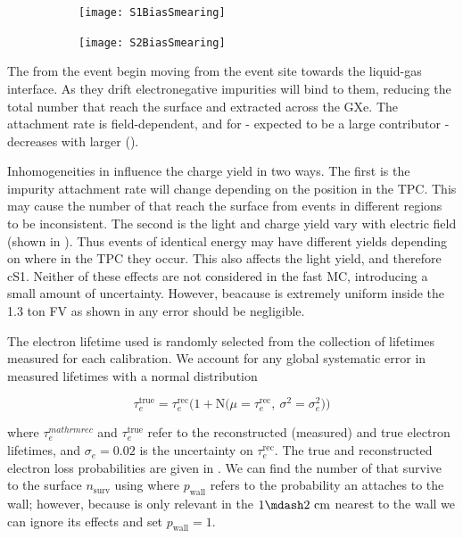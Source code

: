 \begin{figure}
    \centering
    \begin{subfigure}[t]{0.45\textwidth}
        \centering
        \texttt{[image: S1BiasSmearing]}
    \end{subfigure}%
    \begin{subfigure}[t]{0.45\textwidth}
        \centering
        \texttt{[image: S2BiasSmearing]}
    \end{subfigure}
    \caption{}
	\label{fig:er_nr_calibrations_parameter_determ_det_phys_bias_smear}
\end{figure}

The \electron from the event begin moving from the event site towards the liquid-gas interface.  As they drift electronegative
impurities will bind to them, reducing the total number that reach the surface and extracted across the GXe.  The attachment rate
is field-dependent, and for  - expected to be a large contributor - decreases with larger \ed
().

Inhomogeneities in \ed influence the charge yield in two ways.  The first is the impurity attachment rate will change depending on the
position in the TPC.   This may cause the number of \electron that reach the surface from events in different regions to be
inconsistent.  The second is the light and charge yield vary with electric field (shown in
).  Thus events of identical energy may have
different yields depending on where in the TPC they occur.  This also affects the light yield, and therefore cS1.  Neither of these
effects are not considered
in the fast MC, introducing a small amount of uncertainty.  However, beacause \ed is extremely uniform inside the 1.3 ton FV as shown in
 any error should be negligible.

The electron lifetime used is randomly selected from the collection of lifetimes measured for each calibration.  We account for any global
systematic error in measured lifetimes  with a normal distribution

\begin{equation}
\tau_{e}^{\mathrm{true}} = \tau_{e}^{\mathrm{rec}} \bigg( 1 + \mathrm{N} \big( \mu = \tau_{e}^{\mathrm{rec}},\ \sigma^2 = \sigma_{e}^2
\big)
\bigg)
\end{equation}

\noindent where $\tau_{e}^{mathrm{rec}}$ and $\tau_{e}^{\mathrm{true}}$ refer to the reconstructed (measured) and true electron
lifetimes, and $\sigma_e = 0.02$ is the uncertainty on $\tau_{e}^{\mathrm{rec}}$.  The true and reconstructed electron loss probabilities
are given in
.  We can find the number of \electron that survive to the surface
$n_{\mathrm{surv}}$ using  where $p_{\mathrm{wall}}$ refers to
the probability an \electron attaches to the wall; however, because is only relevant in the $1 \mdash 2\ \mathrm{cm}$ nearest to the wall
we can ignore its effects and set $p_{\mathrm{wall}} = 1$.


